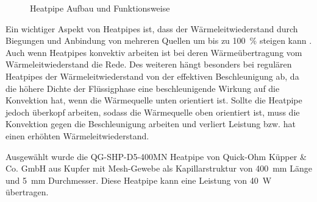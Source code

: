 \begin{figure}
  \centering
  \caption{Heatpipe Aufbau und Funktionsweise}\label{fig:waermerohr}
\end{figure}

Ein wichtiger Aspekt von Heatpipes ist, dass der Wärmeleitwiederstand durch Biegungen und Anbindung von mehreren Quellen um bis zu \SI{100}{\percent}
steigen kann \cite{Mooney-2020}. Auch wenn Heatpipes konvektiv arbeiten ist bei deren Wärmeübertragung vom Wärmeleitwiederstand die Rede.
Des weiteren hängt besonders bei regulären Heatpipes der Wärmeleitwiederstand von der effektiven Beschleunigung ab,
da die höhere Dichte der Flüssigphase eine beschleunigende Wirkung auf die Konvektion hat, wenn die Wärmequelle unten orientiert ist. Sollte die Heatpipe jedoch
\glqq überkopf \grqq{} arbeiten, sodass die Wärmequelle oben orientiert ist, muss die Konvektion gegen die Beschleunigung arbeiten und verliert Leistung bzw. hat
einen erhöhten Wärmeleitwiederstand.

Ausgewählt wurde die QG-SHP-D5-400MN Heatpipe von Quick-Ohm Küpper \& Co. GmbH aus Kupfer mit Mesh-Gewebe als Kapillarstruktur von \SI{400}{\milli\meter} Länge und
\SI{5}{\milli\meter} Durchmesser. Diese Heatpipe kann eine Leistung von \SI{40}{\watt} übertragen.


